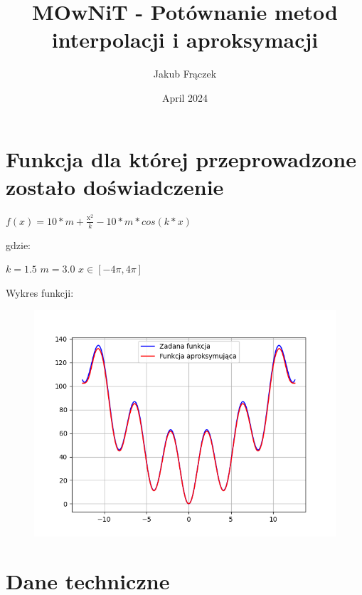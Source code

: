 \documentclass{article}
\title{MOwNiT - Potównanie metod interpolacji i aproksymacji}
\author{Jakub Frączek}
\date{April 2024}
\begin{document}
\maketitle

\section{Funkcja dla której przeprowadzone zostało doświadczenie}

\begin{center}
\(f(x) = 10 * m + \frac{\mathrm{x}_{}^{2}}{k} - 10 * m * cos(k*x)\)
\end{center}

\noindent
gdzie:

\bigbreak

\(k = 1.5\)
\newline \indent
\(m = 3.0\)
\newline \indent
\(x \in [-4\pi, 4\pi]\)

\bigbreak

\noindent
Wykres funkcji:

\begin{figure}[H]
  \centering
  \begin{minipage}[b]{0.5\textwidth}
    \includegraphics[width=\textwidth]{zadana_funkcja.png}
  \end{minipage}
\end{figure}

\section{Dane techniczne}
\end{document}
